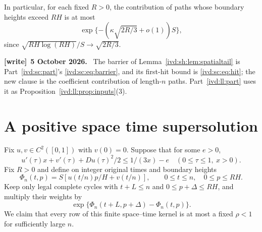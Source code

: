 \documentclass[11pt,letterpaper]{article}
\theoremstyle{remark}\newtheorem{remark}[theorem]{Remark}
\numberwithin{equation}{section}
\newenvironment{writenote}[1][]{\par\smallskip\begingroup\small
 \noindent\textbf{[write]}\if\relax\detokenize{#1}\relax\else~\textbf{#1.}\fi\ }%
 {\par\endgroup\smallskip}
\begin{document}
In particular, for each fixed $R>0$, the contribution of paths whose
boundary heights exceed $RH$ is at most
\begin{equation}\label{ivd:sh:eq:Rtail}
 \exp\{-(\kappa\sqrt{2R/3}+o(1))S\},
\end{equation}
since $\sqrt{RH\log(RH)}/S\to\sqrt{2R/3}$.
\begin{writenote}[5 October 2026]
The barrier of Lemma~\ref{ivd:sh:lem:spatialtail} is Part~\ref{ivd:sc:part}'s \eqref{ivd:sc:eq:barrier}, and its first-hit bound is \eqref{ivd:sc:eq:hit}; the new clause is the coefficient contribution of length-$n$ paths. Part~\ref{ivd:ll:part} uses it as Proposition~\ref{ivd:ll:prop:inputs}(3).
\end{writenote}

\section{A positive space time supersolution}\label{ivd:sh:sec:upper}
Fix $u,v\in C^2([0,1])$ with $v(0)=0$. Suppose that for some $e>0$,
\begin{equation}\label{ivd:sh:eq:HJ}
 u'(\tau)x+v'(\tau)+Du(\tau)^2/2
       \le1/(3x)-e
 \quad(0\le\tau\le1,\ x>0).
\end{equation}
Fix $R>0$ and define on integer original times and boundary heights
\begin{equation}\label{ivd:sh:eq:Phi}
 \Phi_n(t,p)=S[u(t/n)p/H+v(t/n)],\qquad
 0\le t\le n,\quad0\le p\le RH.
\end{equation}
Keep only legal complete cycles with $t+L\le n$ and
$0\le p+\Delta\le RH$, and multiply their weights by
\begin{equation}\label{ivd:sh:eq:Phitransform}
 \exp\{\Phi_n(t+L,p+\Delta)-\Phi_n(t,p)\}.
\end{equation}
We claim that every row of this finite space--time kernel is at most a
fixed $\rho<1$ for sufficiently large $n$.
\end{document}
